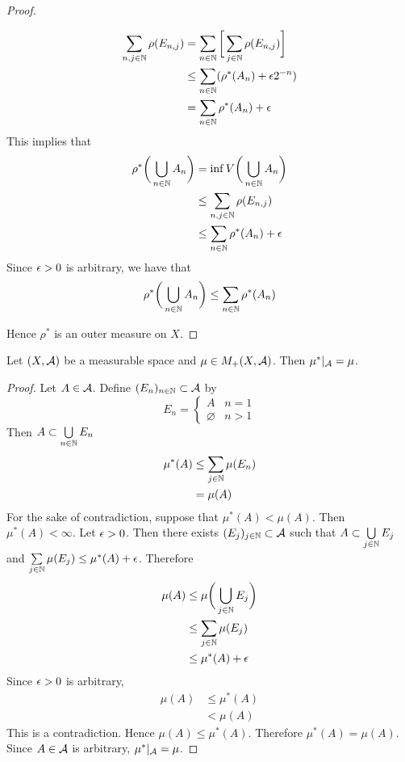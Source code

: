 \documentclass{book}
\begin{document}
\begin{proof}
\begin{enumerate}
\begin{align*}
				\sum_{n,j \in \mathbb{N}} \rho(E_{n,j}) 
				& = \sum_{n \in \mathbb{N}} \bigg[ \sum_{j \in \mathbb{N}} \rho(E_{n,j})  \bigg] \\
				& \leq \sum_{n \in \mathbb{N}} (\rho^*(A_n) + \epsilon 2^{-n}) \\
				& = \sum_{n \in \mathbb{N}} \rho^*(A_n) + \epsilon
			\end{align*}
			This implies that 
			\begin{align*}
				\rho^* \bigg( \bigcup\limits_{n \in \mathbb{N}} A_n \bigg) 
				& = \inf V \bigg( \bigcup\limits_{n \in \mathbb{N}} A_n \bigg) \\
				& \leq \sum_{n,j \in \mathbb{N}} \rho(E_{n,j})  \\
				& \leq \sum_{n \in \mathbb{N}} \rho^*(A_n) + \epsilon
			\end{align*}
			Since $\epsilon >0$ is arbitrary, we have that
			$$\rho^* \bigg( \bigcup\limits_{n \in \mathbb{N}} A_n \bigg) \leq \sum_{n \in \mathbb{N}} \rho^*(A_n)$$
		\end{enumerate}
		Hence $\rho^*$ is an outer measure on $X$.
	\end{proof}
	
	\begin{ex}  
		Let $(X, \mathcal{A})$ be a measurable space and $\mu \in M_+(X, \mathcal{A})$. Then $\mu^*|_{\mathcal{A}} = \mu$.
	\end{ex}
	
	\begin{proof}
		Let $A \in \mathcal{A}$. Define $(E_n)_{n \in \mathbb{N}} \subset \mathcal{A}$ by 
		\[
		E_n = 
		\begin{cases}
			A & n = 1 \\
			\varnothing & n > 1
		\end{cases}  
		\]
		Then $A \subset \bigcup\limits_{n \in \mathbb{N}} E_n$
		\begin{align*}
			\mu^*(A)
			& \leq \sum_{j \in \mathbb{N}} \mu(E_n) \\
			& = \mu(A) 
		\end{align*}
		For the sake of contradiction, suppose that $\mu^*(A) < \mu(A)$. Then $\mu^*(A) < \infty$. Let $\epsilon > 0$. Then there exists $(E_j)_{j \in \mathbb{N}} \subset \mathcal{A}$ such that $A \subset \bigcup\limits_{j \in \mathbb{N}} E_j$ and $\sum\limits_{j \in \mathbb{N}} \mu(E_j) \leq \mu^*(A) + \epsilon$. Therefore
		\begin{align*}
			\mu(A)
			& \leq \mu \bigg ( \bigcup\limits_{j \in \mathbb{N}} E_j \bigg) \\
			& \leq \sum_{j \in \mathbb{N}} \mu(E_j) \\
			& \leq \mu^*(A) + \epsilon 
		\end{align*}
		Since $\epsilon >0$ is arbitrary,  
		\begin{align*}
			\mu(A) 
			& \leq \mu^*(A) \\
			& < \mu(A)
		\end{align*}
		This is a contradiction. Hence $\mu(A) \leq \mu^*(A)$. Therefore  $\mu^*(A) = \mu(A)$. Since $A \in \mathcal{A}$ is arbitrary, $\mu^*|_{\mathcal{A}} = \mu$.
	\end{proof}
	
\end{document}
